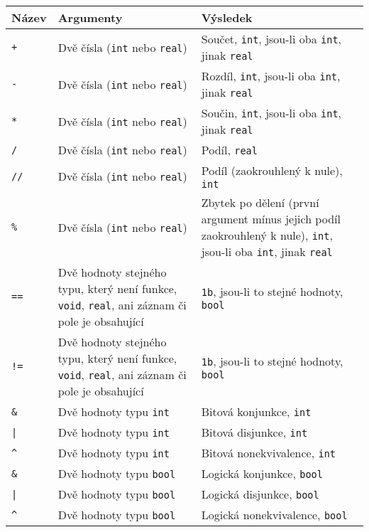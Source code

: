 \documentclass[a4paper,12pt]{article}
\begin{document}
\begin{tabular}{|m{2cm} m{5.5cm} m{7cm}|}\hline
Název & Argumenty & Výsledek\\\hline
\texttt{+} & Dvě čísla (\texttt{int} nebo \texttt{real}) & Součet, \texttt{int}, jsou-li oba \texttt{int}, jinak \texttt{real}\\\hline
\texttt{-} & Dvě čísla (\texttt{int} nebo \texttt{real}) & Rozdíl, \texttt{int}, jsou-li oba \texttt{int}, jinak \texttt{real}\\\hline
\texttt{*} & Dvě čísla (\texttt{int} nebo \texttt{real}) & Součin, \texttt{int}, jsou-li oba \texttt{int}, jinak \texttt{real}\\\hline
\texttt{/} & Dvě čísla (\texttt{int} nebo \texttt{real}) & Podíl, \texttt{real}\\\hline
\texttt{//} & Dvě čísla (\texttt{int} nebo \texttt{real}) & Podíl (zaokrouhlený k nule), \texttt{int}\\\hline
\texttt{\%} & Dvě čísla (\texttt{int} nebo \texttt{real}) & Zbytek po dělení (první argument mínus jejich podíl zaokrouhlený k nule), \texttt{int}, jsou-li oba \texttt{int}, jinak \texttt{real}\\\hline
\texttt{==} & Dvě hodnoty stejného typu, který není funkce, \texttt{void}, \texttt{real}, ani záznam či pole je obsahující & \texttt{1b}, jsou-li to stejné hodnoty, \texttt{bool}\\\hline
\texttt{!=} & Dvě hodnoty stejného typu, který není funkce, \texttt{void}, \texttt{real}, ani záznam či pole je obsahující & \texttt{1b}, jsou-li to stejné hodnoty, \texttt{bool}\\\hline
\texttt{\&} & Dvě hodnoty typu \texttt{int} & Bitová konjunkce, \texttt{int}\\\hline
\texttt{|} & Dvě hodnoty typu \texttt{int} & Bitová disjunkce, \texttt{int}\\\hline
\texttt{\^} & Dvě hodnoty typu \texttt{int} & Bitová nonekvivalence, \texttt{int}\\\hline
\texttt{\&} & Dvě hodnoty typu \texttt{bool} & Logická konjunkce, \texttt{bool}\\\hline
\texttt{|} & Dvě hodnoty typu \texttt{bool} & Logická disjunkce, \texttt{bool}\\\hline
\texttt{\^} & Dvě hodnoty typu \texttt{bool} & Logická nonekvivalence, \texttt{bool}\\\hline
\end{tabular}
\end{document}
